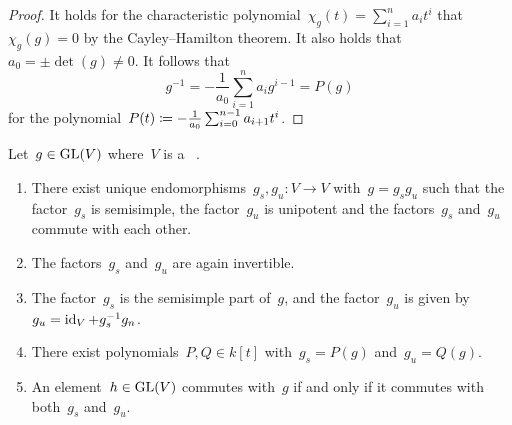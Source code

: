 \begin{proof}
  It holds for the characteristic polynomial~$\chi_g(t) = \sum_{i=1}^n a_i t^i$ that~$\chi_g(g) = 0$ by the Cayley\nobreakdash--Hamilton theorem.
  It also holds that~$a_0 = \pm \det(g) \neq 0$.
  It follows that
  \[
      g^{-1}
    = -\frac{1}{a_0} \sum_{i=1}^n a_i g^{i-1}
    = P(g)
  \]
  for the polynomial~$P(t) \coloneqq -\frac{1}{a_0} \sum_{i=0}^{n-1} a_{i+1} t^i$.
\end{proof}


\begin{proposition}
  \label{mjcd}
  Let~$g \in \operatorname{GL}(V)$ where~$V$ is a {\fd}~{\kvs}.
  \begin{enumerate}
    \item
      \label{the mjcd itself}
      There exist unique endomorphisms~$g_s, g_u \colon V \to V$ with~$g = g_s g_u$ such that the factor~$g_s$ is semisimple, the factor~$g_u$ is unipotent and the factors~$g_s$ and~$g_u$ commute with each other.
    \item
      \label{ss and unipotent part invertible}
      The factors~$g_s$ and~$g_u$ are again invertible.
    \item
      \label{global description of mcjd}
      The factor~$g_s$ is the semisimple part of~$g$, and the factor~$g_u$ is given by~$g_u = \operatorname{id}_V + g_s^{-1} g_n$.
    \item
      \label{existence of polynomials for mjcd}
      There exist polynomials~$P, Q \in k[t]$ with~$g_s = P(g)$ and~$g_u = Q(g)$.
    \item
      \label{commuting via mjcd}
      An element~$h \in \operatorname{GL}(V)$ commutes with~$g$ if and only if it commutes with both~$g_s$ and~$g_u$.
  \end{enumerate}
\end{proposition}


